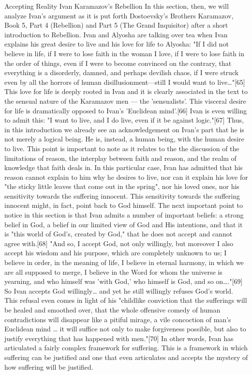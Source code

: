 Accepting Reality
Ivan Karamazov’s Rebellion
In this section, then, we will analyze Ivan's argument as it is put forth Dostoevsky's Brothers Karamazov, Book 5, Part 4 (Rebellion) and Part 5 (The Grand Inquisitor) after a short introduction to Rebellion. Ivan and Alyosha are talking over tea when Ivan explains his great desire to live and his love for life to Alyosha: 
"If I did not believe in life, if I were to lose faith in the woman I love, if I were to lose faith in the order of things, even if I were to become convinced on the contrary, that everything is a disorderly, damned, and perhaps devilish chaos, if I were struck even by all the horrors of human disillusionment—still I would want to live…"[65] 
This love for life is deeply rooted in Ivan and it is clearly associated in the text to the sensual nature of the Karamazov men — the 'sensualists'. This visceral desire for life is dramatically opposed to Ivan's 'Euclidean mind'.[66] Ivan is even willing to admit this: "I want to live, and I do live, even if it be against logic."[67] Thus, in this introduction we already see an acknowledgement on Ivan's part that he is not merely a logical being. He is, instead, a human being, with the human desire to live. This point is important to note as it relates to the the discussion of the limitations of reason, the interplay between faith and reason, and the realm of knowledge that faith deals in. In this particular case, Ivan has admitted that his reason cannot explain to him why he desires to live, nor can it explain his love for "the sticky little leaves that come out in the spring", nor his loved ones, nor his sensitivity towards the suffering innocent. This sensitivity towards the suffering innocent might, in fact, point back to God himself.
The next important point to notice in this section is that Ivan admits a number of important beliefs: a strong belief in God, a belief in our limited view of God and His intentions, and that it is "this world of God's, created by God," that he does not accept and cannot agree with.[68] 
"And so, I accept God, not only willingly, but moreover I also accept his wisdom and his purpose, which are completely unknown to us; I believe in order, in the meaning of life, I believe in eternal harmony, in which we are all supposed to merge, I believe in the Word for whom the universe is yearning, and who himself was 'with God,' who himself is God, and so on…."[69] 
So Ivan accepts God willingly… and yet he still willingly refuses God's world. This refusal even comes in light of his "childlike conviction that the sufferings will be healed and smoothed over, that the whole offensive comedy of human contradictions will disappear like a pitiful mirage, a vile concoction of man's Euclidean mind … it will suffice not only to make forgiveness possible, but also to justify everything that has happened with men."[70] In other words, Ivan has articulated a fairly complex framework for suffering. This is a framework in which suffering can be justified and one that even articulates and accepts the mystery of how suffering will be justified.
